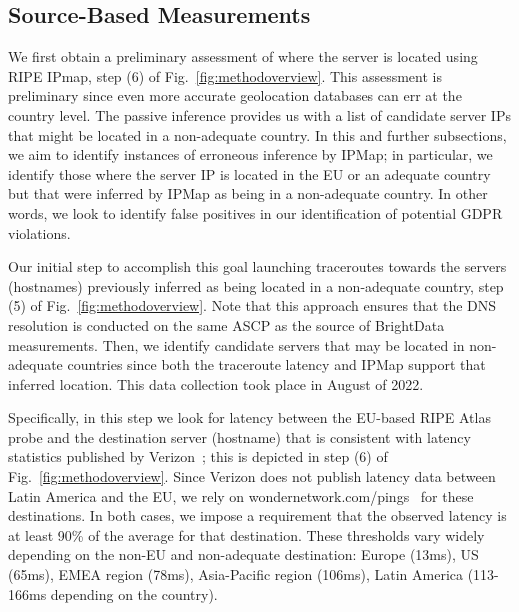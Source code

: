 





\subsection{Source-Based Measurements}
\label{sec:source-based}


We first obtain a preliminary assessment of where the server is located using RIPE IPmap,
step (6) of Fig.~\ref{fig:methodoverview}. %
This assessment is preliminary since even more accurate geolocation databases can err at the country level.
The passive inference %
provides us with a list of candidate server IPs that
might be located in a non-adequate country.
In this and further subsections, we aim to
identify instances of erroneous inference by IPMap;
in particular, we identify those where the server IP
is located in the EU or an adequate country but that were inferred by IPMap
as being in a non-adequate country. In other words, we look to identify false positives
in our identification of potential GDPR violations.

Our initial step to accomplish this goal
launching traceroutes towards the servers
(hostnames) previously inferred as being located in a non-adequate country,
step (5) of Fig.~\ref{fig:methodoverview}.
Note that this approach ensures that the DNS resolution is conducted 
on the same ASCP as the source of BrightData measurements.
Then, we identify candidate servers that may be located in non-adequate countries since
both the traceroute latency and IPMap support that inferred location.
This data collection took place in August of 2022.

Specifically, in this step we look for latency between the EU-based
RIPE Atlas probe and the destination server (hostname)
that is consistent with latency statistics published by Verizon~\cite{MonthlyI86:online};
this is depicted in step (6) of Fig.~\ref{fig:methodoverview}.
Since Verizon does not publish latency data between Latin America and the EU, we
rely on wondernetwork.com/pings~\cite{GlobalPi56:online} for these destinations.
In both cases, we impose a requirement that the observed latency is at least 90\%
of the average for that destination. These thresholds vary widely depending on 
the non-EU and non-adequate destination: Europe (13ms), US (65ms), EMEA region (78ms), 
Asia-Pacific region (106ms), Latin America (113-166ms depending on the country).

